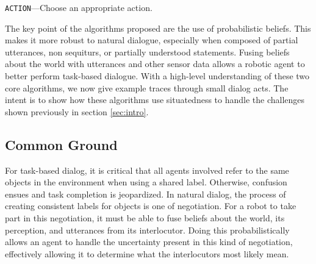 \documentclass[12pt]{article}
\begin{document}
\begin{algorithm}
  \DontPrintSemicolon
  \caption{ \texttt{ACTION}---Choose an appropriate action.}
  \label{algo:action}
\end{algorithm}

The key point of the algorithms proposed are the use of probabilistic
beliefs. This makes it more robust to natural dialogue, especially
when composed of partial utterances, non sequiturs, or partially
understood statements. Fusing beliefs about the world with utterances
and other sensor data allows a robotic agent to better perform
task-based dialogue. With a high-level understanding of these two core
algorithms, we now give example traces through small dialog acts. The
intent is to show how these algorithms use situatedness to handle the
challenges shown previously in section \ref{sec:intro}.

\subsection{Common Ground}
For task-based dialog, it is critical that all agents involved refer
to the same objects in the environment when using a shared
label. Otherwise, confusion ensues and task completion is
jeopardized. In natural dialog, the process of creating consistent
labels for objects is one of negotiation. For a robot to take part in
this negotiation, it must be able to fuse beliefs about the world, its
perception, and utterances from its interlocutor. Doing this
probabilistically allows an agent to handle the uncertainty present in
this kind of negotiation, effectively allowing it to determine what
the interlocutors most likely mean.
\end{document}
